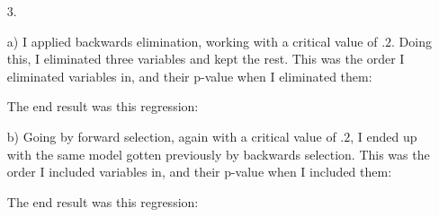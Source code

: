 \documentclass[11pt]{article}
\theoremstyle{definition}
\begin{document}
\begin{itemize}
\begin{itemize}
        \end{itemize}
    \item[3.]
        \item[a)]
            I applied backwards elimination, working with a critical value of $.2$. Doing this, I eliminated three variables and kept the rest.
            \smallskip
            This was the order I eliminated variables in, and their p-value when I eliminated them:\\
            \FloatBarrier
            
            \FloatBarrier                
            The end result was this regression: \\
            \FloatBarrier
            
            \FloatBarrier                
        \item[b)]
            Going by forward selection, again with a critical value of $.2$, I ended up with the same model gotten previously by backwards selection. 
            \smallskip
            This was the order I included variables in, and their p-value when I included them:\\
            \FloatBarrier
            
            \FloatBarrier                
            The end result was this regression: \\
            \FloatBarrier
            
            \FloatBarrier                


\end{itemize}
\end{document}
